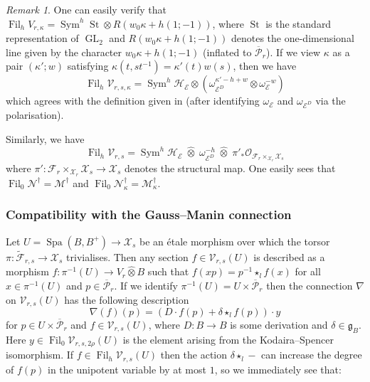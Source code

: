 \documentclass[10pt, oneside]{amsart}
\renewcommand{\tilde}{\widetilde}
\numberwithin{equation}{subsection}
\theoremstyle{definition}
\theoremstyle{remark}
\newtheorem{remark}[equation]{Remark}
\newcommand{\hatot}{\hat{\otimes}}
\newcommand{\opn}[1]{\operatorname{#1}}
\begin{document}
\begin{remark}
    One can easily verify that $\opn{Fil}_h V_{r, \kappa} = \opn{Sym}^h \opn{St} \otimes R(w_0\kappa + h(1; -1))$, where $\opn{St}$ is the standard representation of $\opn{GL}_2$ and $R(w_0\kappa + h(1;-1))$ denotes the one-dimensional line given by the character $w_0\kappa + h(1;-1)$ (inflated to $\overline{\mathcal{P}}_r$). If we view $\kappa$ as a pair $(\kappa'; w)$ satisfying $\kappa(t, st^{-1}) = \kappa'(t)w(s)$, then we have
    \[
    \opn{Fil}_h \mathcal{V}_{r, s, \kappa} = \opn{Sym}^h \mathcal{H}_{\mathcal{E}} \otimes \left(\omega_{\mathcal{E}^D}^{\kappa' -h + w} \otimes \omega_{\mathcal{E}}^{- w}  \right)
    \]
    which agrees with the definition given in \cite{Urban} (after identifying $\omega_{\mathcal{E}}$ and $\omega_{\mathcal{E}^D}$ via the polarisation). 

    Similarly, we have
    \[
    \opn{Fil}_h\mathcal{V}_{r, s} = \opn{Sym}^h\mathcal{H}_{\mathcal{E}} \; \hatot \; \omega_{\mathcal{E}^D}^{-h} \; \hatot \; \pi'_* \mathcal{O}_{\mathcal{F}_r \times_{\mathcal{X}_r} \mathcal{X}_s}
    \]
    where $\pi' \colon \mathcal{F}_r \times_{\mathcal{X}_r} \mathcal{X}_s \to \mathcal{X}_s$ denotes the structural map. One easily sees that $\opn{Fil}_0\mathcal{N}^{\dagger} = \mathcal{M}^{\dagger}$ and $\opn{Fil}_0\mathcal{N}_{\kappa}^{\dagger} = \mathcal{M}^{\dagger}_{\kappa}$.
\end{remark}

\subsubsection{Compatibility with the Gauss--Manin connection}

Let $U=\opn{Spa}(B, B^+) \to \mathcal{X}_s$ be an \'{e}tale morphism over which the torsor $\pi \colon \tilde{\mathcal{F}}_{r, s} \to \mathcal{X}_s$ trivialises. Then any section $f \in \mathcal{V}_{r, s}(U)$ is described as a morphism $f \colon \pi^{-1}(U) \to V_r \hatot B$ such that $f(xp) = p^{-1} \star_l f(x)$ for all $x \in \pi^{-1}(U)$ and $p \in \overline{\mathcal{P}}_r$. If we identify $\pi^{-1}(U) = U \times \overline{\mathcal{P}}_r$ then the connection $\nabla$ on $\mathcal{V}_{r, s}(U)$ has the following description
\[
\nabla(f)(p) = (D \cdot f(p) + \delta \star_l f(p)) \cdot y
\]
for $p \in U \times \overline{\mathcal{P}}_r$ and $f \in \mathcal{V}_{r, s}(U)$, where $D \colon B \to B$ is some derivation and $\delta \in \mathfrak{g}_B$. Here $y \in \opn{Fil}_0\mathcal{V}_{r, s, 2\rho}(U)$ is the element arising from the Kodaira--Spencer isomorphism. If $f \in \opn{Fil}_h\mathcal{V}_{r, s}(U)$ then the action $\delta \star_l -$ can increase the degree of $f(p)$ in the unipotent variable by at most $1$, so we immediately see that:
\end{document}

